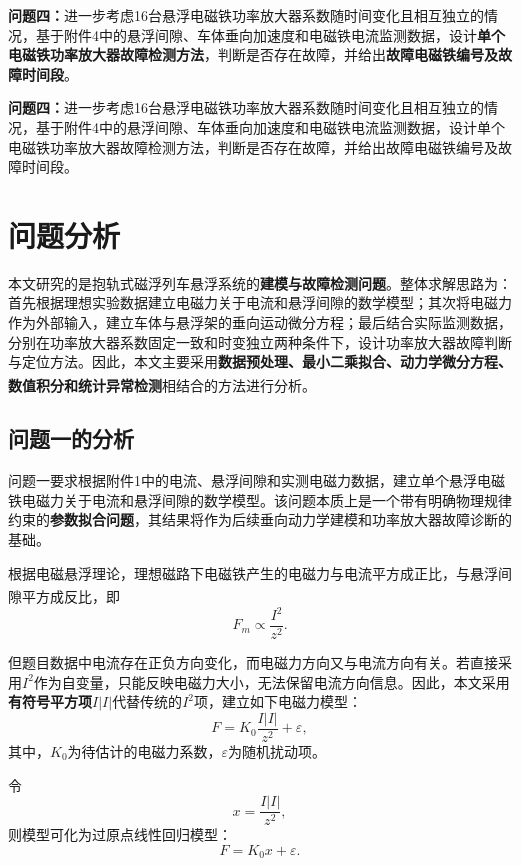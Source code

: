 \documentclass[a4paper]{nmmcm}
\newcommand{\upcite}[1]{\textsuperscript{\cite{#1}}}
\begin{document}
\indent \textbf{问题四：}进一步考虑16台悬浮电磁铁功率放大器系数随时间变化且相互独立的情况，基于附件4中的悬浮间隙、车体垂向加速度和电磁铁电流监测数据，设计\textbf{单个电磁铁功率放大器故障检测方法}，判断是否存在故障，并给出\textbf{故障电磁铁编号及故障时间段}。

\indent \textbf{问题四：}进一步考虑16台悬浮电磁铁功率放大器系数随时间变化且相互独立的情况，基于附件4中的悬浮间隙、车体垂向加速度和电磁铁电流监测数据，设计单个电磁铁功率放大器故障检测方法，判断是否存在故障，并给出故障电磁铁编号及故障时间段。

\section{问题分析}

\setlength{\parindent}{2em}

本文研究的是抱轨式磁浮列车悬浮系统的\textbf{建模与故障检测问题}。整体求解思路为：首先根据理想实验数据建立电磁力关于电流和悬浮间隙的数学模型；其次将电磁力作为外部输入，建立车体与悬浮架的垂向运动微分方程；最后结合实际监测数据，分别在功率放大器系数固定一致和时变独立两种条件下，设计功率放大器故障判断与定位方法。因此，本文主要采用\textbf{数据预处理、最小二乘拟合、动力学微分方程、数值积分和统计异常检测}相结合的方法进行分析\upcite{1}。

\subsection{问题一的分析}

问题一要求根据附件1中的电流、悬浮间隙和实测电磁力数据，建立单个悬浮电磁铁电磁力关于电流和悬浮间隙的数学模型。该问题本质上是一个带有明确物理规律约束的\textbf{参数拟合问题}，其结果将作为后续垂向动力学建模和功率放大器故障诊断的基础。

根据电磁悬浮理论，理想磁路下电磁铁产生的电磁力与电流平方成正比，与悬浮间隙平方成反比\upcite{2}，即
\begin{equation}
F_m\propto \frac{I^2}{z^2}.
\end{equation}

但题目数据中电流存在正负方向变化，而电磁力方向又与电流方向有关。若直接采用$I^2$作为自变量，只能反映电磁力大小，无法保留电流方向信息。因此，本文采用\textbf{有符号平方项$I|I|$}代替传统的$I^2$项，建立如下电磁力模型：
\begin{equation}
F=K_0\frac{I|I|}{z^2}+\varepsilon,
\end{equation}
其中，$K_0$为待估计的电磁力系数，$\varepsilon$为随机扰动项。

令
\begin{equation}
x=\frac{I|I|}{z^2},
\end{equation}
则模型可化为过原点线性回归模型：
\begin{equation}
F=K_0x+\varepsilon.
\end{equation}
\end{document}
